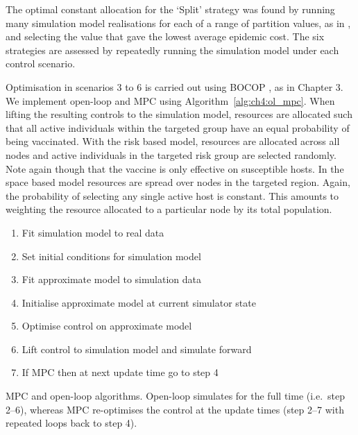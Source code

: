 The optimal constant allocation for the `Split' strategy was found by running many simulation model realisations for each of a range of partition values, as in \cite{cunniffe_optimising_2015}, and selecting the value that gave the lowest average epidemic cost. The six strategies are assessed by repeatedly running the simulation model under each control scenario.

Optimisation in scenarios 3 to 6 is carried out using BOCOP \citep{bocop}, as in Chapter 3. We implement open-loop and MPC using Algorithm~\ref{alg:ch4:ol_mpc}. When lifting the resulting controls to the simulation model, resources are allocated such that all active individuals within the targeted group have an equal probability of being vaccinated. With the risk based model, resources are allocated across all nodes and active individuals in the targeted risk group are selected randomly. Note again though that the vaccine is only effective on susceptible hosts. In the space based model resources are spread over nodes in the targeted region. Again, the probability of selecting any single active host is constant. This amounts to weighting the resource allocated to a particular node by its total population.
 
\begin{algorithm}
    \begin{enumerate}
        \item{}Fit simulation model to real data
        \item{}Set initial conditions for simulation model
        \item{}Fit approximate model to simulation data
        \item{}Initialise approximate model at current simulator state
        \item{}Optimise control on approximate model
        \item{}Lift control to simulation model and simulate forward
        \item{}If MPC then at next update time go to step 4
    \end{enumerate}
\caption{MPC and open-loop algorithms. Open-loop simulates for the full time (i.e.\ step 2--6), whereas MPC re-optimises the control at the update times (step 2--7 with repeated loops back to step 4).\label{alg:ch4:ol_mpc}}
\end{algorithm}

